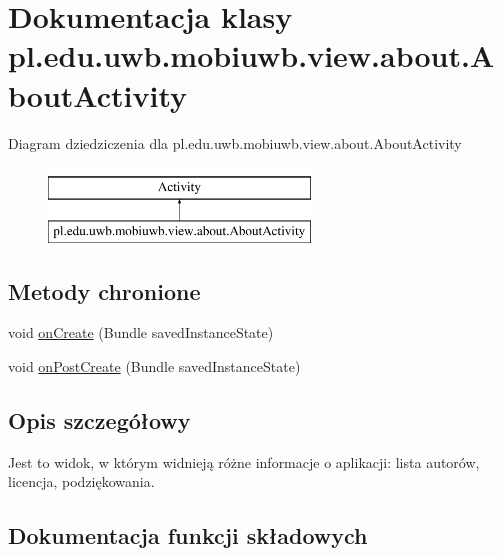\hypertarget{classpl_1_1edu_1_1uwb_1_1mobiuwb_1_1view_1_1about_1_1_about_activity}{}\section{Dokumentacja klasy pl.\+edu.\+uwb.\+mobiuwb.\+view.\+about.\+About\+Activity}
\label{classpl_1_1edu_1_1uwb_1_1mobiuwb_1_1view_1_1about_1_1_about_activity}
Diagram dziedziczenia dla pl.\+edu.\+uwb.\+mobiuwb.\+view.\+about.\+About\+Activity\begin{figure}[H]
\begin{center}
\leavevmode
\includegraphics[height=2.000000cm]{classpl_1_1edu_1_1uwb_1_1mobiuwb_1_1view_1_1about_1_1_about_activity}
\end{center}
\end{figure}
\subsection*{Metody chronione}
\begin{DoxyCompactItemize}
\item 
void \hyperlink{classpl_1_1edu_1_1uwb_1_1mobiuwb_1_1view_1_1about_1_1_about_activity_a14831861d50f864e51c69dc179be0e72}{on\+Create} (Bundle saved\+Instance\+State)
\item 
void \hyperlink{classpl_1_1edu_1_1uwb_1_1mobiuwb_1_1view_1_1about_1_1_about_activity_a3f78c081fc65586e7f0e20e6e078624d}{on\+Post\+Create} (Bundle saved\+Instance\+State)
\end{DoxyCompactItemize}


\subsection{Opis szczegółowy}
Jest to widok, w którym widnieją różne informacje o aplikacji\+: lista autorów, licencja, podziękowania. 

\subsection{Dokumentacja funkcji składowych}
\hypertarget{classpl_1_1edu_1_1uwb_1_1mobiuwb_1_1view_1_1about_1_1_about_activity_a14831861d50f864e51c69dc179be0e72}{}
